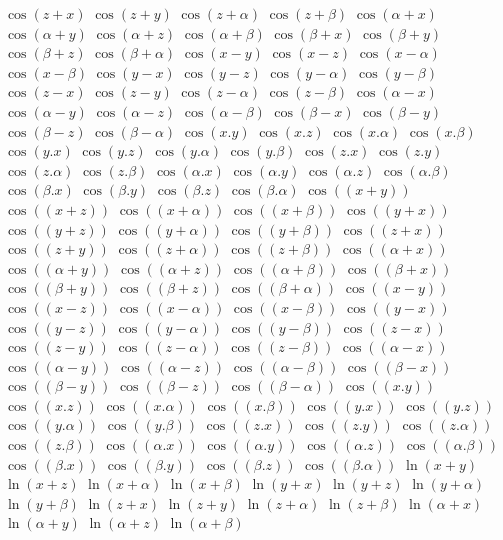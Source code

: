 $ \cos(z + x) $
$ \cos(z + y) $
$ \cos(z + \alpha) $
$ \cos(z + \beta) $
$ \cos(\alpha + x) $
$ \cos(\alpha + y) $
$ \cos(\alpha + z) $
$ \cos(\alpha + \beta) $
$ \cos(\beta + x) $
$ \cos(\beta + y) $
$ \cos(\beta + z) $
$ \cos(\beta + \alpha) $
$ \cos(x - y) $
$ \cos(x - z) $
$ \cos(x - \alpha) $
$ \cos(x - \beta) $
$ \cos(y - x) $
$ \cos(y - z) $
$ \cos(y - \alpha) $
$ \cos(y - \beta) $
$ \cos(z - x) $
$ \cos(z - y) $
$ \cos(z - \alpha) $
$ \cos(z - \beta) $
$ \cos(\alpha - x) $
$ \cos(\alpha - y) $
$ \cos(\alpha - z) $
$ \cos(\alpha - \beta) $
$ \cos(\beta - x) $
$ \cos(\beta - y) $
$ \cos(\beta - z) $
$ \cos(\beta - \alpha) $
$ \cos(x . y) $
$ \cos(x . z) $
$ \cos(x . \alpha) $
$ \cos(x . \beta) $
$ \cos(y . x) $
$ \cos(y . z) $
$ \cos(y . \alpha) $
$ \cos(y . \beta) $
$ \cos(z . x) $
$ \cos(z . y) $
$ \cos(z . \alpha) $
$ \cos(z . \beta) $
$ \cos(\alpha . x) $
$ \cos(\alpha . y) $
$ \cos(\alpha . z) $
$ \cos(\alpha . \beta) $
$ \cos(\beta . x) $
$ \cos(\beta . y) $
$ \cos(\beta . z) $
$ \cos(\beta . \alpha) $
$ \cos((x + y)) $
$ \cos((x + z)) $
$ \cos((x + \alpha)) $
$ \cos((x + \beta)) $
$ \cos((y + x)) $
$ \cos((y + z)) $
$ \cos((y + \alpha)) $
$ \cos((y + \beta)) $
$ \cos((z + x)) $
$ \cos((z + y)) $
$ \cos((z + \alpha)) $
$ \cos((z + \beta)) $
$ \cos((\alpha + x)) $
$ \cos((\alpha + y)) $
$ \cos((\alpha + z)) $
$ \cos((\alpha + \beta)) $
$ \cos((\beta + x)) $
$ \cos((\beta + y)) $
$ \cos((\beta + z)) $
$ \cos((\beta + \alpha)) $
$ \cos((x - y)) $
$ \cos((x - z)) $
$ \cos((x - \alpha)) $
$ \cos((x - \beta)) $
$ \cos((y - x)) $
$ \cos((y - z)) $
$ \cos((y - \alpha)) $
$ \cos((y - \beta)) $
$ \cos((z - x)) $
$ \cos((z - y)) $
$ \cos((z - \alpha)) $
$ \cos((z - \beta)) $
$ \cos((\alpha - x)) $
$ \cos((\alpha - y)) $
$ \cos((\alpha - z)) $
$ \cos((\alpha - \beta)) $
$ \cos((\beta - x)) $
$ \cos((\beta - y)) $
$ \cos((\beta - z)) $
$ \cos((\beta - \alpha)) $
$ \cos((x . y)) $
$ \cos((x . z)) $
$ \cos((x . \alpha)) $
$ \cos((x . \beta)) $
$ \cos((y . x)) $
$ \cos((y . z)) $
$ \cos((y . \alpha)) $
$ \cos((y . \beta)) $
$ \cos((z . x)) $
$ \cos((z . y)) $
$ \cos((z . \alpha)) $
$ \cos((z . \beta)) $
$ \cos((\alpha . x)) $
$ \cos((\alpha . y)) $
$ \cos((\alpha . z)) $
$ \cos((\alpha . \beta)) $
$ \cos((\beta . x)) $
$ \cos((\beta . y)) $
$ \cos((\beta . z)) $
$ \cos((\beta . \alpha)) $
$ \ln(x + y) $
$ \ln(x + z) $
$ \ln(x + \alpha) $
$ \ln(x + \beta) $
$ \ln(y + x) $
$ \ln(y + z) $
$ \ln(y + \alpha) $
$ \ln(y + \beta) $
$ \ln(z + x) $
$ \ln(z + y) $
$ \ln(z + \alpha) $
$ \ln(z + \beta) $
$ \ln(\alpha + x) $
$ \ln(\alpha + y) $
$ \ln(\alpha + z) $
$ \ln(\alpha + \beta) $
